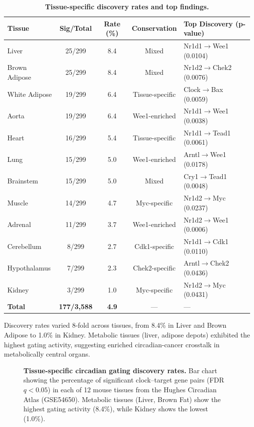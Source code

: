 \documentclass[11pt,a4paper]{article}
\begin{document}
\begin{table}[H]
\centering
\caption{\textbf{Tissue-specific discovery rates and top findings.}}
\label{tab:tissue_summary}
\begin{tabular}{lcccl}
\toprule
\textbf{Tissue} & \textbf{Sig/Total} & \textbf{Rate (\%)} & \textbf{Conservation} & \textbf{Top Discovery (p-value)} \\
\midrule
Liver & 25/299 & 8.4 & Mixed & Nr1d1$\rightarrow$Wee1 (0.0104) \\
Brown Adipose & 25/299 & 8.4 & Mixed & Nr1d2$\rightarrow$Chek2 (0.0076) \\
White Adipose & 19/299 & 6.4 & Tissue-specific & Clock$\rightarrow$Bax (0.0059) \\
Aorta & 19/299 & 6.4 & Wee1-enriched & Nr1d1$\rightarrow$Wee1 (0.0038) \\
Heart & 16/299 & 5.4 & Tissue-specific & Nr1d1$\rightarrow$Tead1 (0.0061) \\
Lung & 15/299 & 5.0 & Wee1-enriched & Arntl$\rightarrow$Wee1 (0.0178) \\
Brainstem & 15/299 & 5.0 & Mixed & Cry1$\rightarrow$Tead1 (0.0048) \\
Muscle & 14/299 & 4.7 & Myc-specific & Nr1d2$\rightarrow$Myc (0.0237) \\
Adrenal & 11/299 & 3.7 & Wee1-enriched & Nr1d2$\rightarrow$Wee1 (0.0006) \\
Cerebellum & 8/299 & 2.7 & Cdk1-specific & Nr1d1$\rightarrow$Cdk1 (0.0110) \\
Hypothalamus & 7/299 & 2.3 & Chek2-specific & Arntl$\rightarrow$Chek2 (0.0436) \\
Kidney & 3/299 & 1.0 & Myc-specific & Nr1d2$\rightarrow$Myc (0.0431) \\
\midrule
\textbf{Total} & \textbf{177/3,588} & \textbf{4.9} & --- & --- \\
\bottomrule
\end{tabular}
\end{table}

Discovery rates varied 8-fold across tissues, from 8.4\% in Liver and Brown Adipose to 1.0\% in Kidney. Metabolic tissues (liver, adipose depots) exhibited the highest gating activity, suggesting enriched circadian-cancer crosstalk in metabolically central organs.

\begin{figure}[H]
\centering
{}
\caption{\textbf{Tissue-specific circadian gating discovery rates.} Bar chart showing the percentage of significant clock--target gene pairs (FDR $q < 0.05$) in each of 12 mouse tissues from the Hughes Circadian Atlas (GSE54650). Metabolic tissues (Liver, Brown Fat) show the highest gating activity (8.4\%), while Kidney shows the lowest (1.0\%).}
\label{fig:discovery_rates}
\end{figure}
\end{document}
